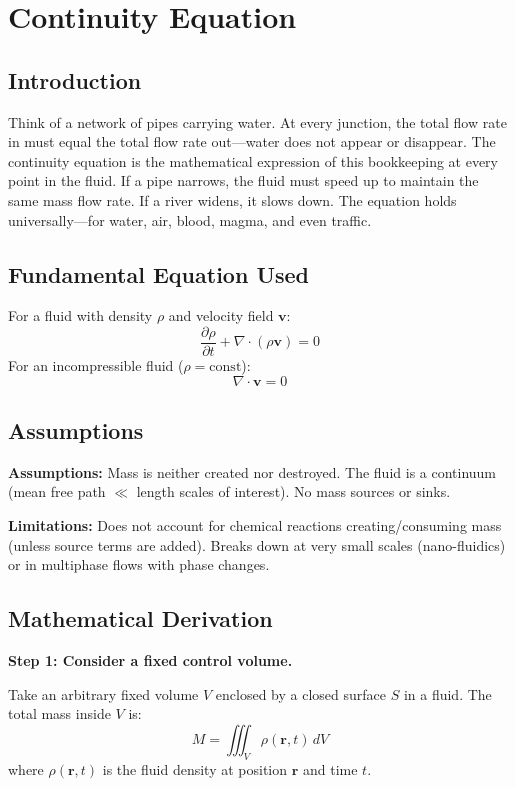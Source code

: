 \chapter{Continuity Equation}

\section*{Introduction}

Think of a network of pipes carrying water. At every junction, the total flow rate in must equal the total flow rate out---water does not appear or disappear. The continuity equation is the mathematical expression of this bookkeeping at every point in the fluid. If a pipe narrows, the fluid must speed up to maintain the same mass flow rate. If a river widens, it slows down. The equation holds universally---for water, air, blood, magma, and even traffic.
\section*{Fundamental Equation Used}

For a fluid with density $\rho$ and velocity field $\mathbf{v}$:
\[
\frac{\partial \rho}{\partial t} + \nabla \cdot (\rho \mathbf{v}) = 0
\]
For an incompressible fluid ($\rho = \text{const}$):
\[
\nabla \cdot \mathbf{v} = 0
\]
\section*{Assumptions}

\textbf{Assumptions:} Mass is neither created nor destroyed. The fluid is a continuum (mean free path $\ll$ length scales of interest). No mass sources or sinks.


\textbf{Limitations:} Does not account for chemical reactions creating/consuming mass (unless source terms are added). Breaks down at very small scales (nano-fluidics) or in multiphase flows with phase changes.


\section*{Mathematical Derivation}

\textbf{Step 1: Consider a fixed control volume.}

Take an arbitrary fixed volume $V$ enclosed by a closed surface $S$ in a fluid. The total mass inside $V$ is:
\begin{equation}
M = \iiint_V \rho(\mathbf{r}, t)\, dV
\end{equation}
where $\rho(\mathbf{r}, t)$ is the fluid density at position $\mathbf{r}$ and time $t$.

